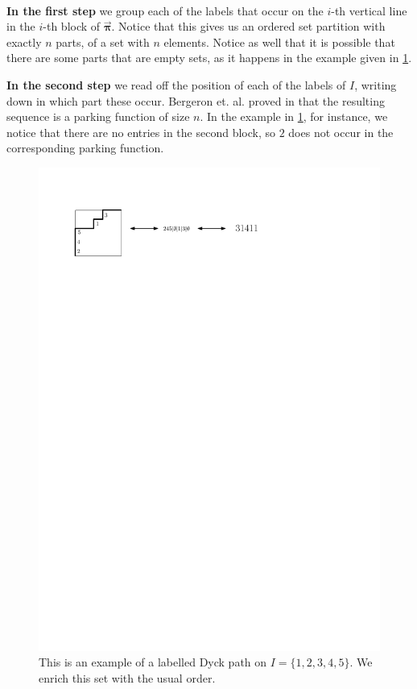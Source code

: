 \documentclass[12pt, reqno]{amsart}
\theoremstyle{definition}
\newcommand{\opi}{\vec{\boldsymbol{\pi}}}
\begin{document}
\

\textbf{In the first step} we group each of the labels that occur on the $i$-th vertical line in the $i$-th block of $\opi$.
Notice that this gives us an ordered set partition with exactly $n$ parts, of a set with $n$ elements.
Notice as well that it is possible that there are some parts that are empty sets, as it happens in the example given in \cref{fig:construction_parking}.

\textbf{In the second step} we read off the position of each of the labels of $I$, writing down in which part these occur.
Bergeron et. al. proved in \cite{BGLPV2021} that the resulting sequence is a parking function of size $n$.
In the example in \cref{fig:construction_parking}, for instance, we notice that there are no entries in the second block, so $2$ does not occur in the corresponding parking function.

\begin{figure}
    \centering
    \includegraphics{images/correspondence_parking.pdf}
    \caption{This is an example of a labelled Dyck path on $I =\{1, 2, 3, 4, 5\}$. We enrich this set with the usual order.}
    \label{fig:construction_parking}
\end{figure}
\end{document}
